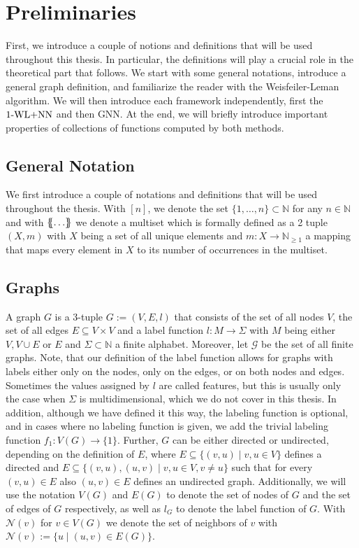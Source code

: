 \section{Preliminaries}
First, we introduce a couple of notions and definitions that will be used throughout this thesis. In particular, the definitions will play a crucial role in the theoretical part that follows. We start with some general notations, introduce a general graph definition, and familiarize the reader with the Weisfeiler-Leman algorithm. We will then introduce each framework independently, first the $\text{1-WL+NN}$ and then GNN. At the end, we will briefly introduce important properties of collections of functions computed by both methods.

\subsection{General Notation}
We first introduce a couple of notations and definitions that will be used throughout the thesis. With $[n]$, we denote the set $\{1, \ldots, n\} \subset \mathbb{N}$ for any $n \in \mathbb{N}$ and with $\{\!\!\{ \ldots \}\!\!\}$ we denote a multiset which is formally defined as a 2 tuple $(X, m)$ with $X$ being a set of all unique elements and $m: X \rightarrow \mathbb{N}_{\geq 1}$ a mapping that maps every element in $X$ to its number of occurrences in the multiset.

\subsection{Graphs}
A graph $G$ is a 3-tuple $G:= (V, E, l)$ that consists of the set of all nodes $V$, the set of all edges $E \subseteq V \times V$ and a label function $l: M \rightarrow \Sigma$ with $M$ being either $V, V \cup E$ or $E$ and $\Sigma \subset \mathbb{N}$ a finite alphabet. Moreover, let $\mathcal{G}$ be the set of all finite graphs. Note, that our definition of the label function allows for graphs with labels either only on the nodes, only on the edges, or on both nodes and edges. Sometimes the values assigned by $l$ are called features, but this is usually only the case when $\Sigma$ is multidimensional, which we do not cover in this thesis. In addition, although we have defined it this way, the labeling function is optional, and in cases where no labeling function is given, we add the trivial labeling function $f_1: V(G) \rightarrow \{1\}$. Further, $G$ can be either directed or undirected, depending on the definition of $E$, where $E \subseteq \{(v,u) \mid v,u \in V\}$ defines a directed and $E \subseteq \{(v, u), (u,v) \mid v,u \in V, v\neq u\}$ such that for every $(v,u) \in E$ also $(u,v) \in E$ defines an undirected graph. Additionally, we will use the notation $V(G)$ and $E(G)$ to denote the set of nodes of $G$ and the set of edges of $G$ respectively, as well as $l_G$ to denote the label function of $G$. With $\mathcal{N}(v)$ for $v \in V(G)$ we denote the set of neighbors of $v$ with $\mathcal{N}(v) := \{u \mid (u, v) \in E(G)\}$.

